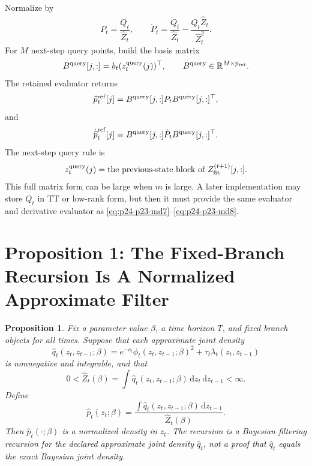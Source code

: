 \documentclass[11pt]{article}
\newtheorem{proposition}{Proposition}
\newcommand{\R}{\mathbb R}
\newcommand{\dd}{\,\mathrm d}
\begin{document}
Normalize by
\[
    P_t=\frac{Q_t}{\widehat Z_t},
    \qquad
    \dot P_t=
    \frac{\dot Q_t}{\widehat Z_t}
    -
    \frac{Q_t\dot{\widehat Z}_t}{\widehat Z_t^2}.
    \label{eq:p24-p23-md5}
\]
For \(M\) next-step query points, build the basis matrix
\[
    B^{\rm query}[j,:]=b_t(z_t^{\rm query}(j))^\top,
    \qquad
    B^{\rm query}\in\R^{M\times p_{\rm ret}}.
    \label{eq:p24-p23-md6}
\]
The retained evaluator returns
\[
    \widehat p_t^{\rm ref}[j]
    =
    B^{\rm query}[j,:]P_tB^{\rm query}[j,:]^\top,
    \label{eq:p24-p23-md7}
\]
and
\[
    \dot{\widehat p}_t^{\rm ref}[j]
    =
    B^{\rm query}[j,:]\dot P_tB^{\rm query}[j,:]^\top.
    \label{eq:p24-p23-md8}
\]
The next-step query rule is
\[
    z_t^{\rm query}(j)
    =
    \text{the previous-state block of }Z_{\rm fit}^{(t+1)}[j,:].
    \label{eq:p24-p23-md9}
\]
This full matrix form can be large when \(m\) is large.  A later
implementation may store \(Q_t\) in TT or low-rank form, but then it must
provide the same evaluator and derivative evaluator as \eqref{eq:p24-p23-md7}--\eqref{eq:p24-p23-md8}.

\section{Proposition 1: The Fixed-Branch Recursion Is A Normalized Approximate Filter}

\begin{proposition}
Fix a parameter value \(\beta\), a time horizon \(T\), and fixed branch objects
for all times.  Suppose that each approximate joint density
\[
    \widehat q_t(z_t,z_{t-1};\beta)
    =
    e^{-c_t}\phi_t(z_t,z_{t-1};\beta)^2
    +
    \tau_t\lambda_t(z_t,z_{t-1})
    \label{eq:p24-p19-77}
\]
is nonnegative and integrable, and that
\[
    0<\widehat Z_t(\beta)
    =
    \int \widehat q_t(z_t,z_{t-1};\beta)\dd z_t\dd z_{t-1}
    <\infty.
    \label{eq:p24-p19-78}
\]
Define
\[
    \widehat p_t(z_t;\beta)
    =
    \frac{\int \widehat q_t(z_t,z_{t-1};\beta)\dd z_{t-1}}
    {\widehat Z_t(\beta)}.
    \label{eq:p24-p19-79}
\]
Then \(\widehat p_t(\cdot;\beta)\) is a normalized density in \(z_t\).  The
recursion is a Bayesian filtering recursion for the declared approximate joint
density \(\widehat q_t\), not a proof that \(\widehat q_t\) equals the exact
Bayesian joint density.
\end{proposition}
\end{document}

